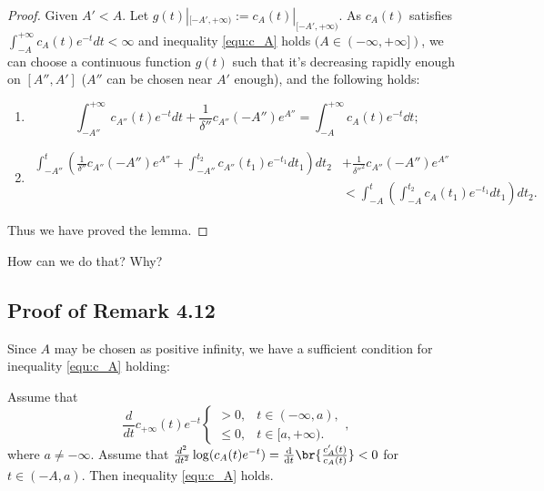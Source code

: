 \documentclass[twoside,openany,12pt]{beautynote}
\begin{document}
\begin{proof}
Given $A'<A$. Let
$g(t)|_{[-A',+\infty)}:=c_{A}(t)|_{[-A',+\infty)}$. As $c_{A}(t)$
satisfies $\int_{-A}^{+\infty}c_{A}(t)e^{-t}dt<\infty$ and
inequality \ref{equ:c_A} holds $(A\in(-\infty,+\infty])$, we can
choose a continuous function $g(t)$ such that it's decreasing
rapidly enough on $[A'',A']$ ($A''$ can be chosen near $A'$ enough),
and the following holds:
\begin{enumerate}[label=(\arabic*).]
  \item $$\int_{-A''}^{+\infty}c_{A''}(t)e^{-t}dt+\frac{1}{\delta''}c_{A''}(-A'')e^{A''}=
\int_{-A}^{+\infty}c_{A}(t)e^{-t}\dd t;$$
  \item \begin{align*}
    \int_{-A''}^{t}\left(\frac{1}{\delta''}c_{A''}(-A'')e^{A''}+\int_{-A''}^{t_{2}}c_{A''}(t_{1})e^{-t_{1}}dt_{1}\right)
dt_{2}&+\frac{1}{{\delta''}^{2}}c_{A''}(-A'')e^{A''}\\
&<\int_{-A}^{t}\left(\int_{-A}^{t_{2}}c_{A}(t_{1})e^{-t_{1}}dt_{1}\right)
dt_{2}.
  \end{align*}
\end{enumerate}

Thus we have proved the lemma.
\end{proof}

\begin{remark}[TODO I]
  How  can we do that? Why?
\end{remark}

\subsection{Proof of Remark 4.12}

Since $A$ may be chosen as positive infinity, we have a sufficient
condition for inequality \ref{equ:c_A} holding:

\begin{remark}[Remark 4.12]\label{r:c_A3}
Assume that 
\[\frac{d}{dt}c_{+\infty}(t)e^{-t}
  \begin{cases}
    >0, & t\in (-\infty,a),\\
    \leq 0, & t\in[a,+\infty).
  \end{cases},
\]
where $a\neq -\infty$.
Assume that $\frac{d^{2}}{dt^{2}}\log(c_{A}(t)e^{-t})=\frac{\dd}{\dd t}\br{\frac{c'_A(t)}{c_A(t)}}<0$ for $t\in (-A,a)$.
Then inequality \ref{equ:c_A} holds.
\end{remark}
\end{document}

